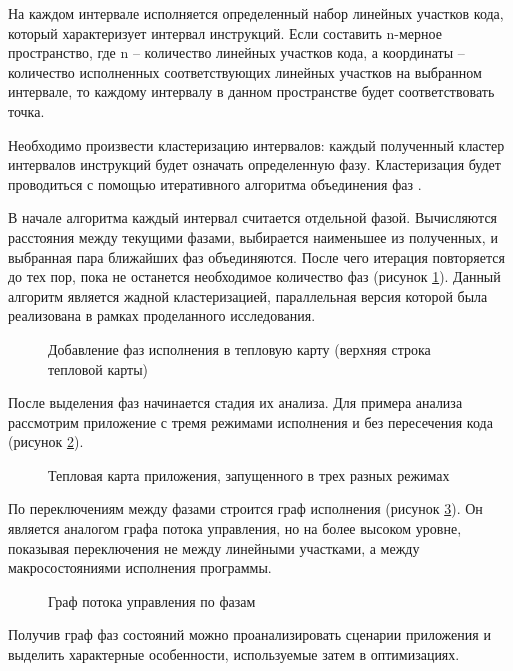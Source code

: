 На каждом интервале исполняется определенный набор линейных участков кода, который характеризует интервал инструкций. Если составить n-мерное пространство, где n – количество линейных участков кода, а координаты – количество исполненных соответствующих линейных участков на выбранном интервале, то каждому интервалу в данном пространстве будет соответствовать точка.

Необходимо произвести кластеризацию интервалов: каждый полученный кластер интервалов инструкций будет означать определенную фазу. Кластеризация будет проводиться с помощью итеративного алгоритма объединения фаз \cite{Vandeputte2007}.

В начале алгоритма каждый интервал считается отдельной фазой. Вычисляются расстояния между текущими фазами, выбирается наименьшее из полученных, и выбранная пара ближайших фаз объединяются. После чего итерация повторяется до тех пор, пока не останется необходимое количество фаз (рисунок \cref{fig:HeatMap2}). Данный алгоритм является жадной кластеризацией, параллельная версия которой была реализована в рамках проделанного исследования.
 
\begin{figure}[!h]
    \centerfloat{
        \texttt{[image: \_10]}
    }
    \caption{Добавление фаз исполнения в тепловую карту (верхняя строка тепловой карты)}\label{fig:HeatMap2}
\end{figure}

После выделения фаз начинается стадия их анализа. Для примера анализа рассмотрим приложение с тремя режимами исполнения и без пересечения кода (рисунок \cref{fig:HeatmapEx}).

 
\begin{figure}[!h]
    \centerfloat{
        \texttt{[image: \_11]}
    }
    \caption{Тепловая карта приложения, запущенного в трех разных режимах}\label{fig:HeatmapEx}
\end{figure}
По переключениям между фазами строится граф исполнения (рисунок \cref{fig:Phase1}). Он является аналогом графа потока управления, но на более высоком уровне, показывая переключения не между линейными участками, а между макросостояниями исполнения программы.
 

\begin{figure}[!h]
    \centerfloat{
        \texttt{[image: \_12]}
    }
    \caption{Граф потока управления по фазам}\label{fig:Phase1}
\end{figure}
Получив граф фаз состояний можно проанализировать сценарии приложения и выделить характерные особенности, используемые затем в оптимизациях.

